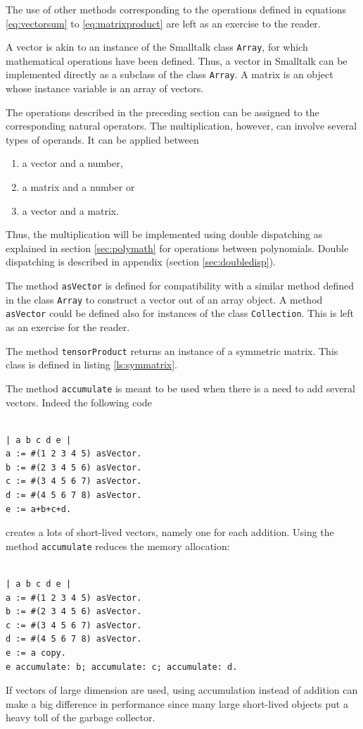 \documentclass[twoside]{book}
\begin{document}
The use of other methods corresponding to the operations defined
in equations \ref{eq:vectorsum} to \ref{eq:matrixproduct} are left
as an exercise to the reader.

 A vector is akin to an instance of the
Smalltalk class {\tt Array}, for which mathematical operations
have been defined. Thus, a vector in Smalltalk can be implemented
directly as a subclass of the class {\tt Array}. A matrix is an
object whose instance variable is an array of vectors.

The operations described in the preceding section can be assigned
to the corresponding natural operators. The multiplication,
however, can involve several types of operands. It can be applied
between
\begin{enumerate}
  \item a vector and a number,
  \item a matrix and a number or
  \item a vector and a matrix.
\end{enumerate}
Thus, the multiplication will be implemented using double
dispatching as explained in section \ref{sec:polymath} for
operations between polynomials. Double dispatching is described in
appendix (\cf section \ref{sec:doubledisp}).

The method {\tt asVector} is defined for compatibility with a
similar method defined in the class {\tt Array} to construct a
vector out of an array object. A method {\tt asVector} could be
defined also for instances of the class {\tt Collection}. This is
left as an exercise for the reader.

The method {\tt tensorProduct} returns an instance of a symmetric
matrix. This class is defined in listing \ref{ls:symmatrix}.

The method {\tt accumulate} is meant to be used when there is a
need to add several vectors. Indeed the following code
\begin{codeExample}
\begin{verbatim}

| a b c d e |
a := #(1 2 3 4 5) asVector.
b := #(2 3 4 5 6) asVector.
c := #(3 4 5 6 7) asVector.
d := #(4 5 6 7 8) asVector.
e := a+b+c+d.
\end{verbatim}
\end{codeExample}
creates a lots of short-lived vectors, namely one
for each addition. Using the method {\tt accumulate} reduces the
memory allocation:
\begin{codeExample}
\begin{verbatim}

| a b c d e |
a := #(1 2 3 4 5) asVector.
b := #(2 3 4 5 6) asVector.
c := #(3 4 5 6 7) asVector.
d := #(4 5 6 7 8) asVector.
e := a copy.
e accumulate: b; accumulate: c; accumulate: d.
\end{verbatim}
\end{codeExample}
If vectors of large dimension are used, using accumulation instead
of addition can make a big difference in performance since many
large short-lived objects put a heavy toll of the garbage
collector.
\end{document}
